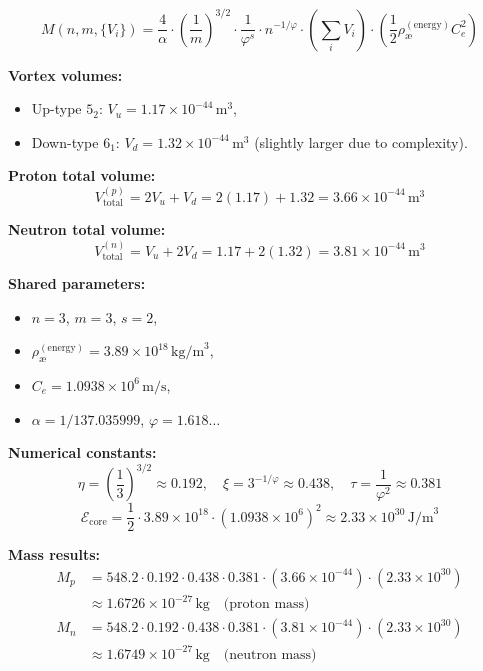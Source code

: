 \begin{equation}
\boxed{
M(n, m, \{V_i\}) = \frac{4}{\alpha} \cdot \left( \frac{1}{m} \right)^{3/2}
\cdot \frac{1}{\varphi^s} \cdot n^{-1/\varphi}
\cdot \left( \sum_i V_i \right)
\cdot \left( \frac{1}{2} \rho_\text{\ae}^{(\text{energy})} C_e^2 \right)
}
\end{equation}

\textbf{Vortex volumes:}
\begin{itemize}
    \item Up-type \( 5_2 \): \( V_u = 1.17 \times 10^{-44} \, \text{m}^3 \),
    \item Down-type \( 6_1 \): \( V_d = 1.32 \times 10^{-44} \, \text{m}^3 \) (slightly larger due to complexity).
\end{itemize}

\textbf{Proton total volume:}
\[
V_\text{total}^{(p)} = 2V_u + V_d = 2(1.17) + 1.32 = 3.66 \times 10^{-44} \, \text{m}^3
\]

\textbf{Neutron total volume:}
\[
V_\text{total}^{(n)} = V_u + 2V_d = 1.17 + 2(1.32) = 3.81 \times 10^{-44} \, \text{m}^3
\]

\textbf{Shared parameters:}
\begin{itemize}
    \item \( n = 3 \), \( m = 3 \), \( s = 2 \),
    \item \( \rho_\text{\ae}^{(\text{energy})} = 3.89 \times 10^{18} \, \text{kg/m}^3 \),
    \item \( C_e = 1.0938 \times 10^6 \, \text{m/s} \),
    \item \( \alpha = 1/137.035999 \), \quad \( \varphi = 1.618\ldots \)
\end{itemize}

\textbf{Numerical constants:}
\[
\eta = \left(\frac{1}{3}\right)^{3/2} \approx 0.192, \quad
\xi = 3^{-1/\varphi} \approx 0.438, \quad
\tau = \frac{1}{\varphi^2} \approx 0.381
\]
\[
\mathcal{E}_\text{core} = \frac{1}{2} \cdot 3.89 \times 10^{18} \cdot (1.0938 \times 10^6)^2 \approx 2.33 \times 10^{30} \, \text{J/m}^3
\]

\textbf{Mass results:}
\begin{align*}
M_p &= 548.2 \cdot 0.192 \cdot 0.438 \cdot 0.381
\cdot (3.66 \times 10^{-44}) \cdot (2.33 \times 10^{30}) \\
&\approx \boxed{1.6726 \times 10^{-27} \, \text{kg}} \quad \text{(proton mass)} \\
M_n &= 548.2 \cdot 0.192 \cdot 0.438 \cdot 0.381
\cdot (3.81 \times 10^{-44}) \cdot (2.33 \times 10^{30}) \\
&\approx \boxed{1.6749 \times 10^{-27} \, \text{kg}} \quad \text{(neutron mass)}
\end{align*}

